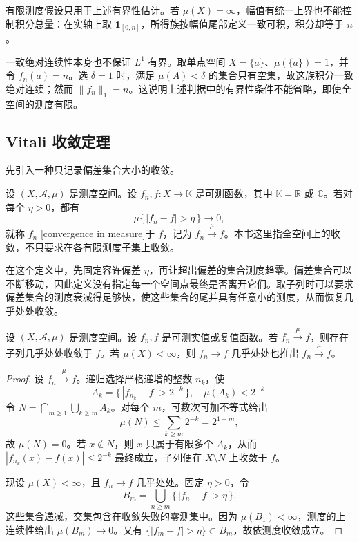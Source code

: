 有限测度假设只用于上述有界性估计。若 \(\mu(X)=\infty\)，幅值有统一上界也不能控制积分总量：在实轴上取 \(\mathbf 1_{[0,n]}\)，所得族按幅值尾部定义一致可积，积分却等于 \(n\)。

\ProseParagraphBreak

一致绝对连续性本身也不保证 \(L^1\) 有界。取单点空间 \(X=\{a\}\)、\(\mu(\{a\})=1\)，并令 \(f_n(a)=n\)。选 \(\delta=1\) 时，满足 \(\mu(A)<\delta\) 的集合只有空集，故这族积分一致绝对连续；然而 \(\|f_n\|_1=n\)。这说明上述判据中的有界性条件不能省略，即使全空间的测度有限。

\subsection{Vitali 收敛定理}
\label{b1:subsec:050503}

先引入一种只记录偏差集合大小的收敛。

\begin{definition}
\label{b1:def:convergence-in-measure}
设 \((X,\mathcal A,\mu)\) 是测度空间。设 \(f_n,f:X\to\mathbb K\) 是可测函数，其中 \(\mathbb K=\mathbb R\) 或 \(\mathbb C\)。若对每个 \(\eta>0\)，都有
\[
\mu\{\,|f_n-f|>\eta\,\}\longrightarrow0,
\]
就称 \(f_n\) [convergence in measure]于 \(f\)，记为 \(f_n\xrightarrow{\mu}f\)。本书这里指全空间上的收敛，不只要求在各有限测度子集上收敛。
\end{definition}

在这个定义中，先固定容许偏差 \(\eta\)，再让超出偏差的集合测度趋零。偏差集合可以不断移动，因此定义没有指定每一个空间点最终是否离开它们。取子列时可以要求偏差集合的测度衰减得足够快，使这些集合的尾并具有任意小的测度，从而恢复几乎处处收敛。

\begin{lemma}
\label{b1:lem:measure-convergence-subsequence}
设 \((X,\mathcal A,\mu)\) 是测度空间。设 \(f_n,f\) 是可测实值或复值函数。若 \(f_n\xrightarrow{\mu}f\)，则存在子列几乎处处收敛于 \(f\)。若 \(\mu(X)<\infty\)，则 \(f_n\to f\) 几乎处处也推出 \(f_n\xrightarrow{\mu}f\)。
\end{lemma}

\begin{proof}
设 \(f_n\xrightarrow{\mu}f\)。递归选择严格递增的整数 \(n_k\)，使
\[
A_k=\{\,|f_{n_k}-f|>2^{-k}\,\},
\quad\mu(A_k)<2^{-k}.
\]
令 \(N=\bigcap_{m\geq1}\bigcup_{k\geq m}A_k\)。对每个 \(m\)，可数次可加不等式给出
\[
\mu(N)\leq\sum_{k\geq m}2^{-k}=2^{1-m},
\]
故 \(\mu(N)=0\)。若 \(x\notin N\)，则 \(x\) 只属于有限多个 \(A_k\)，从而 \(|f_{n_k}(x)-f(x)|\leq2^{-k}\) 最终成立，子列便在 \(X\setminus N\) 上收敛于 \(f\)。

现设 \(\mu(X)<\infty\)，且 \(f_n\to f\) 几乎处处。固定 \(\eta>0\)，令
\[
B_m=\bigcup_{n\geq m}\{\,|f_n-f|>\eta\,\}.
\]
这些集合递减，交集包含在收敛失败的零测集中。因为 \(\mu(B_1)<\infty\)，测度的上连续性给出 \(\mu(B_m)\to0\)。又有 \(\{|f_m-f|>\eta\}\subset B_m\)，故依测度收敛成立。
\end{proof}

